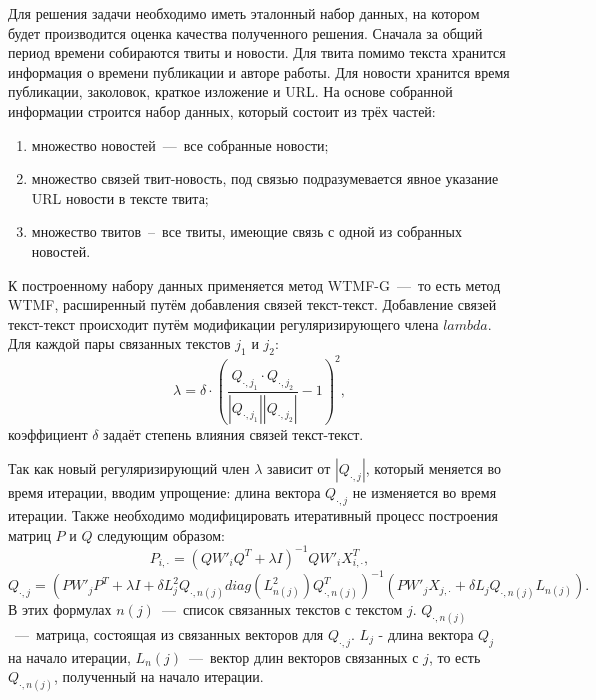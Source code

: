         Для решения задачи необходимо иметь эталонный набор данных, на котором будет производится оценка качества полученного решения.
        Сначала за общий период времени собираются твиты и новости.
        Для твита помимо текста хранится информация о времени публикации и авторе работы. Для новости хранится время публикации, заколовок, краткое изложение и URL.
        На основе собранной информации строится набор данных, который состоит из трёх частей:
        \begin{enumerate}
            \item множество новостей~---~все собранные новости;
            \item множество связей твит-новость, под связью подразумевается явное указание URL новости в тексте твита;
            \item множество твитов~--~все твиты, имеющие связь с одной из собранных новостей.
        \end{enumerate}
        К построенному набору данных применяется метод WTMF-G~---~то есть метод WTMF, расширенный путём добавления связей текст-текст.
        Добавление связей текст-текст происходит путём модификации регуляризирующего члена $lambda$. Для каждой пары связанных текстов $j_1$ и $j_2$:
        \begin{equation}
            \lambda = \delta \cdot (\dfrac{Q_{\cdot,j_1}\cdot Q_{\cdot,j_2}}{|Q_{\cdot,j_1}|| Q_{\cdot,j_2}|}-1)^2,
        \end{equation}
        коэффициент $\delta$ задаёт степень влияния связей текст-текст.

        Так как новый регуляризирующий член $\lambda$ зависит от $|Q_{\cdot,j}|$, который меняется во время итерации, вводим упрощение: длина вектора $Q_{\cdot,j}$ не изменяется во время итерации.
        Также необходимо модифицировать итеративный процесс построения матриц $P$ и $Q$ следующим образом:
        \begin{equation}
            P_{i, \cdot} = (Q W'_i Q^T + \lambda I)^{-1} Q W'_i X_{i,\cdot}^T,
        \end{equation}
        \begin{equation}
            Q_{\cdot, j} = (P W'_j P^T + \lambda I + \delta  L_j^2 Q_{\cdot,n(j)} diag(L^2_{n(j)})Q_{\cdot,n(j)}^T)^{-1}   (P W'_j X_{j,\cdot} + \delta  L_j Q_{\cdot,n(j)} L_{n(j)}).
        \end{equation}
        В этих формулах $n(j)$~---~список связанных текстов с текстом $j$. $Q_{\cdot,n(j)}$~---~матрица, состоящая из связанных векторов для $Q_{\cdot, j}$.
        $L_j$ - длина вектора $Q_j$ на начало итерации, $L_n(j)$~---~вектор длин векторов связанных с $j$, то есть $Q_{\cdot,n(j)}$, полученный на начало итерации.

